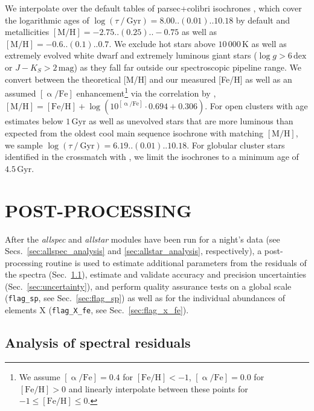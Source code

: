 \documentclass[
  journal=pasa,
  manuscript=research-paper, %
  year=2024,
  volume=37
]{cup-journal}
\begin{document}
We interpolate over the default tables of {\sc parsec+colibri} isochrones \citep{Bressan2012, Marigo2017}, which cover the logarithmic ages of $\log (\tau~/~\mathrm{Gyr}) = 8.00..(0.01)..10.18$ by default and metallicities $\mathrm{[M/H]} = -2.75..(0.25)..-0.75$ as well as $\mathrm{[M/H]} = -0.6..(0.1)..0.7$. We exclude hot stars above $10\,000\,\mathrm{K}$ as well as extremely evolved white dwarf and extremely luminous giant stars ($\log g > 6\,\mathrm{dex}$ or $J - K_S > 2\,\mathrm{mag}$) as they fall far outside our spectroscopic pipeline range. We convert between the theoretical [M/H] and our measured [Fe/H] as well as an assumed $\mathrm{[\upalpha/Fe]}$ enhancement\footnote{We assume $\mathrm{[\upalpha/Fe]} = 0.4$ for $\mathrm{[Fe/H]} < -1$, $\mathrm{[\upalpha/Fe]} = 0.0$ for $\mathrm{[Fe/H]} > 0$ and linearly interpolate between these points for $-1 \leq \mathrm{[Fe/H]} \leq 0$.} via the correlation by \citet{Salaris2006}, $\mathrm{[M/H]} = \mathrm{[Fe/H]} + \log\left(10^{\mathrm{[\upalpha/Fe]}} \cdot 0.694 + 0.306 \right)$. For open clusters with age estimates below $1\,\mathrm{Gyr}$ as well as unevolved stars that are more luminous than expected from the oldest cool main sequence isochrone with matching $\mathrm{[M/H]}$, we sample $\log (\tau~/~\mathrm{Gyr}) = 6.19..(0.01)..10.18$. For globular cluster stars identified in the crossmatch with \citet{Baumgardt2021}, we limit the isochrones to a minimum age of $4.5\,\mathrm{Gyr}$.

\section{POST-PROCESSING}
\label{sec:post_processing}

After the \textit{allspec} and  \textit{allstar} modules have been run for a night's data (see Secs.~\ref{sec:allspec_analysis} and \ref{sec:allstar_analysis}, respectively), a post-processing routine is used to estimate additional parameters from the residuals of the spectra (Sec.~\ref{sec:residual_analysis}), estimate and validate accuracy and precision uncertainties (Sec.~\ref{sec:uncertainty}), and perform quality assurance tests on a global scale (\texttt{flag\_sp}, see Sec.~\ref{sec:flag_sp}) as well as for the individual abundances of elements X (\texttt{flag\_X\_fe}, see Sec.~\ref{sec:flag_x_fe}).

\subsection{Analysis of spectral residuals} \label{sec:residual_analysis}
\end{document}
